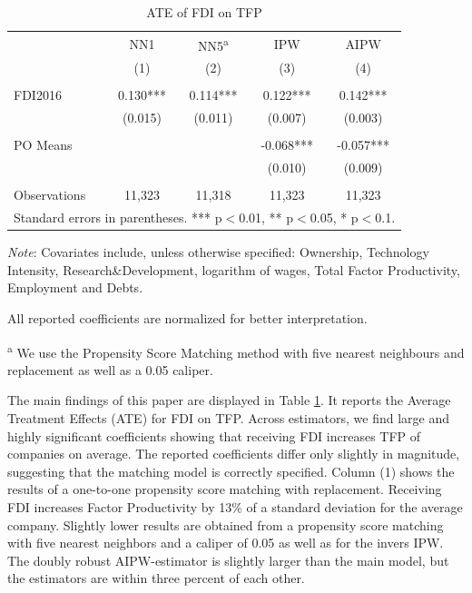 \documentclass[a4paper,11pt]{scrartcl}
\begin{document}
\begin{table}[h]
 	\centering
   	\caption{ATE of FDI on TFP}
   	\label{tab:mainresults}
\begin{threeparttable}

\begin{tabular}{lcccc} 
	\hline
	\hline
 			& NN1 & NN5\textsuperscript{a} & IPW & AIPW \\
 			& (1) & (2) & (3)  & (4) \\ \hline
 			&  &  &  &    \\
FDI2016 	& 0.130*** & 0.114*** & 0.122***  & 0.142***   \\
 			& (0.015) & (0.011) & (0.007) &   (0.003)  \\
 	&  &  &  &    \\
PO Means 	& & & -0.068*** &  -0.057*** \\
			&  &  & (0.010)  &  (0.009) \\
			&  &  &  &    \\
 Observations & 11,323 & 11,318 & 11,323 & 11,323 \\ 
 	\hline
 	\hline
	\multicolumn{5}{c}{\footnotesize{Standard errors in parentheses. *** p$<$0.01, ** p$<$0.05, * p$<$0.1. }}
\end{tabular}

\begin{tablenotes}[flushleft]
      \footnotesize
\item \textit{Note}: Covariates include, unless otherwise specified: Ownership, Technology Intensity, Research\&Development, logarithm of wages, Total Factor Productivity, Employment and Debts. 
\item All reported coefficients are normalized for better interpretation. %
\item\textsuperscript{a} We use the Propensity Score Matching method with five nearest neighbours and replacement as well as a 0.05 caliper. 
\end{tablenotes}

\end{threeparttable}
\end{table}

The main findings of this paper are displayed in Table \ref{tab:mainresults}. It reports the Average Treatment Effects (ATE) for FDI on TFP. Across estimators, we find large and highly significant coefficients showing that receiving FDI increases TFP of companies on average. The reported coefficients differ only slightly in magnitude, suggesting that the matching model is correctly specified.  Column (1) shows the results of a one-to-one propensity score matching with replacement. Receiving FDI  increases Factor Productivity by 13\% of a standard deviation for the average company. Slightly lower results are obtained from a propensity score matching with five nearest neighbors and a caliper of 0.05 as well as for the invers IPW. The doubly robust AIPW-estimator is slightly larger than the main model, but the estimators are within three percent of each other.
\end{document}

